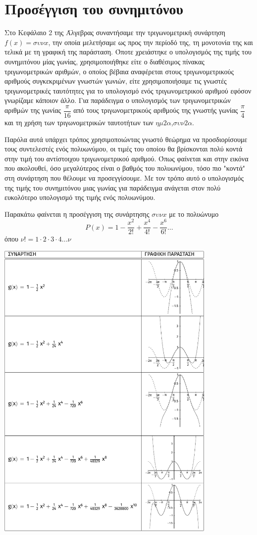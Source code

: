 \documentclass[11pt]{article}
\begin{document}
\section*{Προσέγγιση του συνημιτόνου}
\begin{multicols}{2}
Στο Κεφάλαιο 2 της Άλγεβρας συναντήσαμε την τριγωνομετρική συνάρτηση ${f(x)=συνx}$, την οποία μελετήσαμε ως προς την περίοδό της, τη μονοτονία της και τελικά με τη γραφική της παράσταση. Όποτε χρειάστηκε ο υπολογισμός της τιμής του συνημιτόνου μίας γωνίας, χρησιμοποιήθηκε είτε ο διαθέσιμος πίνακας τριγωνομετρικών αριθμών, ο οποίος βέβαια αναφέρεται στους τριγωνομετρικούς αριθμούς συγκεκριμένων γνωστών γωνιών, είτε χρησιμοποιήσαμε τις γνωστές τριγωνομετρικές ταυτότητες για το υπολογισμό ενός τριγωνομετρικού αριθμού εφόσον γνωρίζαμε κάποιον άλλο. Για παράδειγμα ο υπολογισμός των τριγωνομετρικών αριθμών της γωνίας $\dfrac{π}{16}$ από τους τριγωνομετρικούς αριθμούς της γνωστής γωνίας $\dfrac{π}{4}$ και τη χρήση των τριγωνομετρικών ταυτοτήτων των $ημ2α$,$συν2α$.

Παρόλα αυτά υπάρχει τρόπος χρησιμοποιώντας γνωστό θεώρημα να προσδιορίσουμε τους συντελεστές ενός πολυωνύμου, οι τιμές του οποίου θα βρίσκονται πολύ κοντά στην τιμή του αντίστοιχου τριγωνομετρικού αριθμού. Όπως φαίνεται και στην εικόνα που ακολουθεί, όσο μεγαλύτερος είναι ο βαθμός του πολυωνύμου, τόσο πιο "κοντά" στη συνάρτηση που θέλουμε να προσεγγίσουμε. Με τον τρόπο αυτό ο υπολογισμός της τιμής του συνημιτόνου μιας γωνίας για παράδειγμα ανάγεται στον πολύ ευκολότερο υπολογισμό της τιμής ενός πολυωνύμου. 
\end{multicols}
Παρακάτω φαίνεται η προσέγγιση της συνάρτησης $συνx$ με το πολυώνυμο \[P(x)=1-\dfrac{x^2}{2!}+\dfrac{x^4}{4!}-\dfrac{x^6}{6!}\dotsc\]
όπου $ν!=1\cdot2\cdot3\cdot4\dots ν$\setlength{\columnsep}{10pt}\setlength{\columnseprule}{0pt}
\begin{center}\includegraphics[width=0.8\textwidth]{tikzpic1.pdf}\end{center}
\end{document}
